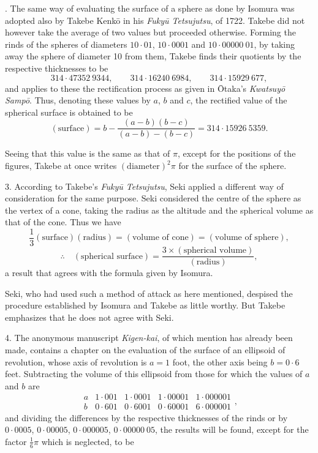 \documentclass[11pt]{article}
\newcommand{\scanpage}[2]{\clearpage\setcounter{footnote}{0}\noindent{\footnotesize\color{gray}PDF page #1 · #2}\par\medskip}
\newcommand{\scanfooter}{}
\begin{document}
\scanpage{0221}{Chapter 27, printed page 207}
2. The same way of evaluating the surface of a sphere as done by Isomura was adopted also by Takebe Kenkō in his \emph{Fukyū Tetsujutsu}, of 1722. Takebe did not however take the average of two values but proceeded otherwise. Forming the rinds of the spheres of diameters $10\cdot01$, $10\cdot0001$ and $10\cdot00000\ 01$, by taking away the sphere of diameter 10 from them, Takebe finds their quotients by the respective thicknesses to be
\[
314\cdot47352\ 9344,\qquad 314\cdot16240\ 6984,\qquad 314\cdot15929\ 677,
\]
and applies to these the rectification process as given in Ōtaka's \emph{Kwatsuyō Sampō}. Thus, denoting these values by $a$, $b$ and $c$, the rectified value of the spherical surface is obtained to be
\[
(\text{surface})=b-\frac{(a-b)(b-c)}{(a-b)-(b-c)}=314\cdot15926\ 5359.
\]

Seeing that this value is the same as that of $\pi$, except for the positions of the figures, Takebe at once writes $(\text{diameter})^2\pi$ for the surface of the sphere.

3. According to Takebe's \emph{Fukyū Tetsujutsu}, Seki applied a different way of consideration for the same purpose. Seki considered the centre of the sphere as the vertex of a cone, taking the radius as the altitude and the spherical volume as that of the cone. Thus we have
\[
\frac13(\text{surface})(\text{radius})=(\text{volume of cone})=(\text{volume of sphere}),
\]
\[
\therefore\quad (\text{spherical surface})=\frac{3\times(\text{spherical volume})}{(\text{radius})},
\]
a result that agrees with the formula given by Isomura.

Seki, who had used such a method of attack as here mentioned, despised the procedure established by Isomura and Takebe as little worthy. But Takebe emphasizes that he does not agree with Seki.

4. The anonymous manuscript \emph{Kigen-kai}, of which mention has already been made, contains a chapter on the evaluation of the surface of an ellipsoid of revolution, whose axis of revolution is $a=1$ foot, the other axis being $b=0\cdot6$ feet. Subtracting the volume of this ellipsoid from those for which the values of $a$ and $b$ are
\[
\begin{array}{c|c|c|c|c}
a&1\cdot001&1\cdot0001&1\cdot00001&1\cdot000001\\
b&0\cdot601&0\cdot6001&0\cdot60001&6\cdot000001
\end{array},
\]
and dividing the differences by the respective thicknesses of the rinds or by $0\cdot0005$, $0\cdot00005$, $0\cdot000005$, $0\cdot00000\ 05$, the results will be found, except for the factor $\frac16\pi$ which is neglected, to be
\scanfooter
\end{document}
